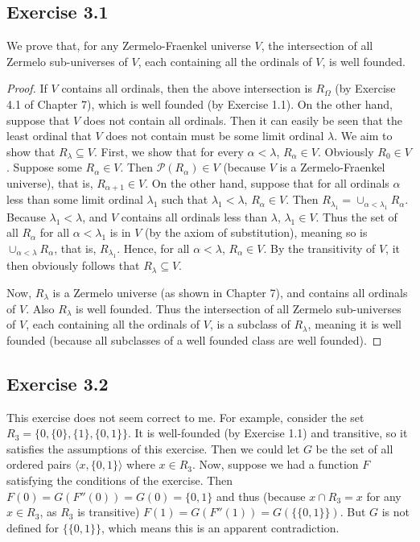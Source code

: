 \documentclass{article}
\theoremstyle{definition}
\begin{document}
\subsection*{Exercise 3.1}
We prove that, for any Zermelo-Fraenkel universe $V$, the intersection of all Zermelo sub-universes of $V$, each containing 
all the ordinals of $V$, is well founded.
\begin{proof}
If $V$ contains all ordinals, then the above intersection is $R_\Omega$ (by Exercise 4.1 of Chapter 7), which is well founded 
(by Exercise 1.1). On the other hand, suppose that $V$ does not contain all ordinals. Then it can easily be seen that 
the least ordinal that $V$ does not contain must be some limit ordinal $\lambda$. We aim to show that $R_\lambda\subseteq V$. First, we 
show that for every $\alpha<\lambda$, $R_\alpha\in V$. Obviously $R_0\in V$. Suppose some $R_\alpha\in V$. Then 
$\mathcal{P}(R_\alpha)\in V$ (because $V$ is a Zermelo-Fraenkel universe), that is, $R_{\alpha+1}\in V$. On the other hand, suppose 
that for all ordinals $\alpha$ less than some limit ordinal $\lambda_1$ such that $\lambda_1<\lambda$, $R_\alpha\in V$. Then 
$R_{\lambda_1}=\cup_{\alpha<\lambda_1}R_\alpha$. Because $\lambda_1<\lambda$, and $V$ contains all ordinals less than $\lambda$, 
$\lambda_1\in V$. Thus the set of all $R_\alpha$ for all $\alpha<\lambda_1$ is in $V$ (by the axiom of substitution), meaning 
so is $\cup_{\alpha<\lambda}R_\alpha$, that is, $R_{\lambda_1}$. Hence, for all $\alpha<\lambda$, $R_\alpha\in V$. By the transitivity of 
$V$, it then obviously follows that $R_\lambda\subseteq V$.

Now, $R_\lambda$ is a Zermelo universe (as shown in Chapter 7), and contains all ordinals of $V$. Also $R_\lambda$ is well founded. 
Thus the intersection of all Zermelo sub-universes of $V$, each containing all the ordinals of $V$, is a subclass of $R_\lambda$, meaning 
it is well founded (because all subclasses of a well founded class are well founded). 
\end{proof}

\subsection*{Exercise 3.2}
This exercise does not seem correct to me. For example, consider the set $R_3=\{0,\{0\},\{1\},\{0,1\}\}$. It is well-founded
(by Exercise 1.1) and transitive, so it satisfies the assumptions of this exercise. Then we could let $G$ be the set of all ordered 
pairs $\langle x,\{0,1\}\rangle$ where $x\in R_3$. Now, suppose we had a function $F$ satisfying the conditions of the exercise. Then
$F(0)=G(F''(0))=G(0)=\{0,1\}$ and thus (because $x\cap R_3=x$ for any $x\in R_3$, as $R_3$ is transitive)
$F(1)=G(F''(1))=G(\{\{0,1\}\})$. But $G$ is not defined for $\{\{0,1\}\}$, which means this is an apparent contradiction.
\end{document}

